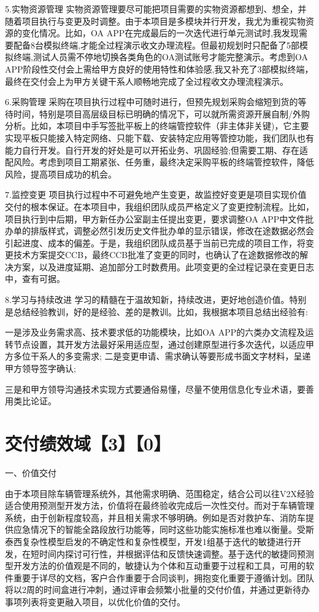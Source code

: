 \documentclass[UTF8]{../computerUniverse}
\begin{document}
5.实物资源管理
实物资源管理要尽可能把项目需要的实物资源都想到、想全，并随着项目执行与变更及时调整。由于本项目是多模块并行开发，我尤为重视实物资源的变化情况。比如，OA APP在完成最后的一次迭代进行单元测试时,我发现需要配备8台模拟终端,才能全过程演示收文办理流程。但最初规划时只配备了5部模拟终端,测试人员需不停地切换各类角色的OA测试账号才能完整演示。考虑到OA APP阶段性交付会上需给甲方良好的使用特性和体验感,我又补充了3部模拟终端，最终在交付会上为甲方关键干系人顺畅地完成了全过程收文办理流程演示。


6.采购管理
采购在项目执行过程中可随时进行，但预先规划采购会缩短到货的等待时间，特别是项目高层级目标已明确的情况下，可以就所需资源开展自制/外购分析。比如，本项目中手写签批平板上的终端管控软件（非主体非关键)，它主要实现平板只能接入特定网络、只能下载、安装特定应用等管控功能，我们团队也有能力自行开发。自行开发的好处是可以开拓业务、巩固经验;但需要工期、存在适配风险。考虑到项目工期紧张、任务重，最终决定采购平板的终端管控软件，降低风险，提高项目成功的机会。


7.监控变更
项目执行过程中不可避免地产生变更，故监控好变更是项目实现价值交付的根本保证。在本项目中，我组织团队成员严格定义了变更控制流程。比如，项目执行到中后期，甲方新任办公室副主任提出变更，要求调整OA APP中文件批办单的排版样式，调整必然引发历史文件批办单的显示错误，修改在途数据必然会引起进度、成本的偏差。于是，我组织团队成员基于当前已完成的项目工作，将变更技术方案提交CCB，最终CCB批准了变更的同时，也确认了在途数据修改的解决方案，以及进度延期、追加部分工时数费用。此项变更的全过程记录在变更日志中，查有可据。

8.学习与持续改进
学习的精髓在于温故知新，持续改进，更好地创造价值。特别是总结经验教训，好的是经验、差的是教训。比如，我根据本项目总结出经验有:

一是涉及业务需求高、技术要求低的功能模块，比如OA APP的六类办文流程及运转节点设置，其开发方法最好采用适应型，通过创建原型进行多次迭代，以适应甲方多位干系人的多变需求;
二是变更申请、需求确认等要形成书面文字材料，呈递甲方领导签字确认;

三是和甲方领导沟通技术实现方式要通俗易懂，尽量不使用信息化专业术语，要善用类比论证。




\chapter{交付绩效域【3】【0】}


一、价值交付

由于本项目除车辆管理系统外，其他需求明确、范围稳定，结合公司以往V2X经验适合使用预测型开发方法，价值将在最终验收完成后一次性交付。而对于车辆管理系统，由于创新程度较高，并且相关需求不够明确。例如是否对救护车、消防车提供应急情况下的智能全路段放行功能等，同时这些功能实施标准也难以衡量。受斯泰西复杂性模型启发的不确定性和复杂性模型，开发1组基于迭代的敏捷进行开发，在短时间内探讨可行性，并根据评估和反馈快速调整。基于迭代的敏捷同预测型开发方法的价值观是不同的，敏捷认为个体和互动重要于过程和工具，可用的软件重要于详尽的文档，客户合作重要于合同谈判，拥抱变化重要于遵循计划。团队将以2周的时间盒进行冲刺，通过评审会频繁小批量的交付价值，并通过更新待办事项列表将变更融入项目，以优化价值的交付。
\end{document}
